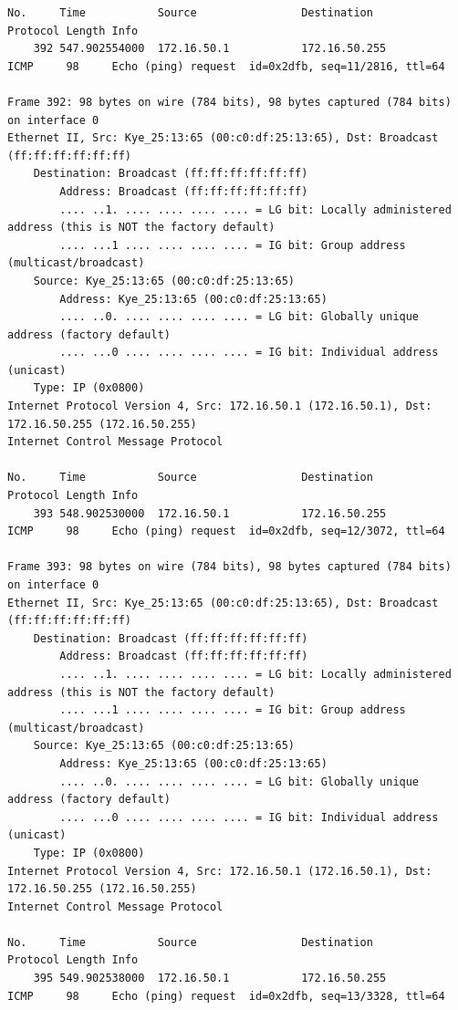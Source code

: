 \documentclass[a4paper,11pt]{article}
\begin{document}
\begin{lstlisting}
No.     Time           Source                Destination           Protocol Length Info
    392 547.902554000  172.16.50.1           172.16.50.255         ICMP     98     Echo (ping) request  id=0x2dfb, seq=11/2816, ttl=64

Frame 392: 98 bytes on wire (784 bits), 98 bytes captured (784 bits) on interface 0
Ethernet II, Src: Kye_25:13:65 (00:c0:df:25:13:65), Dst: Broadcast (ff:ff:ff:ff:ff:ff)
    Destination: Broadcast (ff:ff:ff:ff:ff:ff)
        Address: Broadcast (ff:ff:ff:ff:ff:ff)
        .... ..1. .... .... .... .... = LG bit: Locally administered address (this is NOT the factory default)
        .... ...1 .... .... .... .... = IG bit: Group address (multicast/broadcast)
    Source: Kye_25:13:65 (00:c0:df:25:13:65)
        Address: Kye_25:13:65 (00:c0:df:25:13:65)
        .... ..0. .... .... .... .... = LG bit: Globally unique address (factory default)
        .... ...0 .... .... .... .... = IG bit: Individual address (unicast)
    Type: IP (0x0800)
Internet Protocol Version 4, Src: 172.16.50.1 (172.16.50.1), Dst: 172.16.50.255 (172.16.50.255)
Internet Control Message Protocol

No.     Time           Source                Destination           Protocol Length Info
    393 548.902530000  172.16.50.1           172.16.50.255         ICMP     98     Echo (ping) request  id=0x2dfb, seq=12/3072, ttl=64

Frame 393: 98 bytes on wire (784 bits), 98 bytes captured (784 bits) on interface 0
Ethernet II, Src: Kye_25:13:65 (00:c0:df:25:13:65), Dst: Broadcast (ff:ff:ff:ff:ff:ff)
    Destination: Broadcast (ff:ff:ff:ff:ff:ff)
        Address: Broadcast (ff:ff:ff:ff:ff:ff)
        .... ..1. .... .... .... .... = LG bit: Locally administered address (this is NOT the factory default)
        .... ...1 .... .... .... .... = IG bit: Group address (multicast/broadcast)
    Source: Kye_25:13:65 (00:c0:df:25:13:65)
        Address: Kye_25:13:65 (00:c0:df:25:13:65)
        .... ..0. .... .... .... .... = LG bit: Globally unique address (factory default)
        .... ...0 .... .... .... .... = IG bit: Individual address (unicast)
    Type: IP (0x0800)
Internet Protocol Version 4, Src: 172.16.50.1 (172.16.50.1), Dst: 172.16.50.255 (172.16.50.255)
Internet Control Message Protocol

No.     Time           Source                Destination           Protocol Length Info
    395 549.902538000  172.16.50.1           172.16.50.255         ICMP     98     Echo (ping) request  id=0x2dfb, seq=13/3328, ttl=64


\end{lstlisting}
\end{document}
